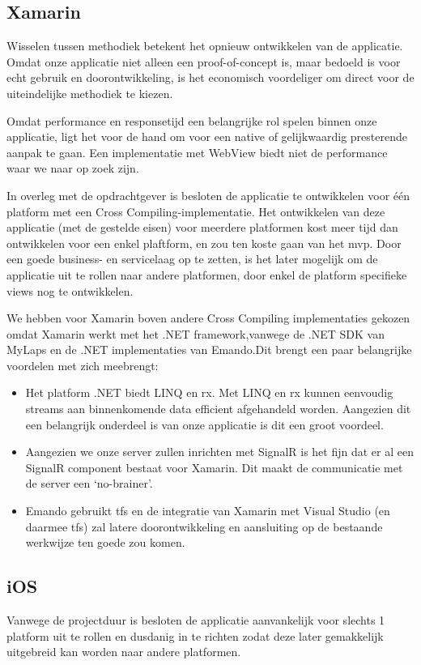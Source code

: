 \subsection{Xamarin}
Wisselen tussen methodiek betekent het opnieuw ontwikkelen van de applicatie. Omdat onze applicatie niet alleen een proof-of-concept is, maar bedoeld is voor echt gebruik en doorontwikkeling, is het economisch voordeliger om direct voor de uiteindelijke methodiek te kiezen.
    
Omdat performance en responsetijd een belangrijke rol spelen binnen onze applicatie, ligt het voor de hand om voor een native of gelijkwaardig presterende aanpak te gaan. Een implementatie met WebView biedt niet de performance waar we naar op zoek zijn.
    
In overleg met de opdrachtgever is besloten de applicatie te ontwikkelen voor \'e\'en platform met een Cross Compiling-implementatie. Het ontwikkelen van deze applicatie (met de gestelde eisen) voor meerdere platformen kost meer tijd dan ontwikkelen voor een enkel plaftform, en zou ten koste gaan van het \ac{mvp}. Door een goede business- en servicelaag op te zetten, is het later mogelijk om de applicatie uit te rollen naar andere platformen, door enkel de platform specifieke views nog te ontwikkelen.

We hebben voor Xamarin boven andere Cross Compiling implementaties gekozen omdat Xamarin werkt met het .NET framework,vanwege de .NET SDK van MyLaps en de .NET implementaties van Emando.Dit brengt een paar belangrijke voordelen met zich meebrengt:

\begin{itemize}
    \item Het platform .NET biedt LINQ en \acf{rx}. Met LINQ en \ac{rx} kunnen eenvoudig streams aan binnenkomende data efficient afgehandeld worden. Aangezien dit een belangrijk onderdeel is van onze applicatie is dit een groot voordeel.
    \item Aangezien we onze server zullen inrichten met SignalR is het fijn dat er al een SignalR component bestaat voor Xamarin. Dit maakt de communicatie met de server een `no-brainer'.
    \item Emando gebruikt \acf{tfs} en de integratie van Xamarin met Visual Studio (en daarmee \ac{tfs}) zal latere doorontwikkeling en aansluiting op de bestaande werkwijze ten goede zou komen.
\end{itemize}

\subsection{iOS}
Vanwege de projectduur is besloten de applicatie aanvankelijk voor slechts 1 platform uit te rollen en dusdanig in te richten zodat deze later gemakkelijk uitgebreid kan worden naar andere platformen. 

